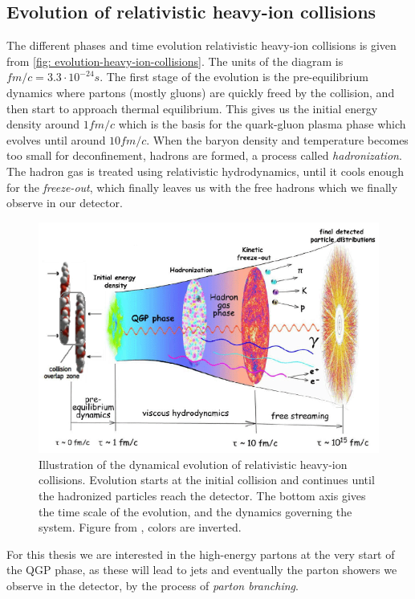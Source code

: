 \documentclass[main.tex]{subfiles}
\begin{document}
\subsection{Evolution of relativistic heavy-ion collisions}
The different phases and time evolution relativistic heavy-ion collisions is given from \autoref{fig: evolution-heavy-ion-collisions}. The units of the diagram is \(fm/c=3.3\cdot 10^{-24}s\). The first stage of the evolution is the pre-equilibrium dynamics where partons (mostly gluons) are quickly freed by the collision, and then start to approach thermal equilibrium. This gives us the initial energy density around \(1fm/c\) which is the basis for the quark-gluon plasma phase which evolves until around \(10fm/c\). When the baryon density and temperature becomes too small for deconfinement, hadrons are formed, a process called \emph{hadronization}. The hadron gas is treated using relativistic hydrodynamics, until it cools enough for the \textit{freeze-out}, which finally leaves us with the free hadrons which we finally observe in our detector. 
\begin{figure}[htb]
    \centering
    \includegraphics[width=12cm]{pictures/figures/evolution-of-relativistic-heavy-ion-collisions.png}
    \caption{Illustration of the dynamical evolution of relativistic heavy-ion collisions. Evolution starts at the initial collision and continues until the hadronized particles reach the detector. The bottom axis gives the time scale of the evolution, and the dynamics governing the system. Figure from \cite{QCD_figures/Scharenberg}, colors are inverted.}
    \label{fig: evolution-heavy-ion-collisions}
\end{figure}

For this thesis we are interested in the high-energy partons at the very start of the QGP phase, as these will lead to jets and eventually the parton showers we observe in the detector, by the process of \emph{parton branching}.
\end{document}
